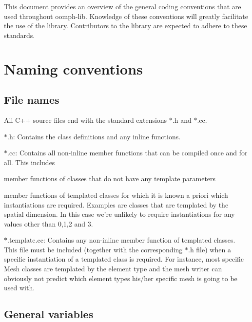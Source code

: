 This document provides an overview of the general coding conventions that are used throughout {\ttfamily oomph-\/lib}. Knowledge of these conventions will greatly facilitate the use of the library. Contributors to the library are expected to adhere to these standards.



 

\hypertarget{index_naming}{}\section{Naming conventions}\label{index_naming}
\hypertarget{index_filenames}{}\subsection{File names}\label{index_filenames}
All C++ source files end with the standard extensions $\ast$.h and $\ast$.cc.


\begin{DoxyItemize}
\item {\ttfamily $\ast$}.h\-: Contains the class definitions and any inline functions.
\item {\ttfamily $\ast$}.cc\-: Contains all non-\/inline member functions that can be compiled once and for all. This includes
\begin{DoxyItemize}
\item member functions of classes that do not have any template parameters
\item member functions of templated classes for which it is known a priori which instantiations are required. Examples are classes that are templated by the spatial dimension. In this case we're unlikely to require instantiations for any values other than 0,1,2 and 3.
\end{DoxyItemize}
\item {\ttfamily $\ast$}.template.\-cc\-: Contains any non-\/inline member function of templated classes. This file must be included (together with the corresponding {\ttfamily $\ast$}.h file) when a specific instantiation of a templated class is required. For instance, most specific {\ttfamily Mesh} classes are templated by the element type and the mesh writer can obviously not predict which element types his/her specific mesh is going to be used with.
\end{DoxyItemize}\hypertarget{index_variables}{}\subsection{General variables}\label{index_variables}

